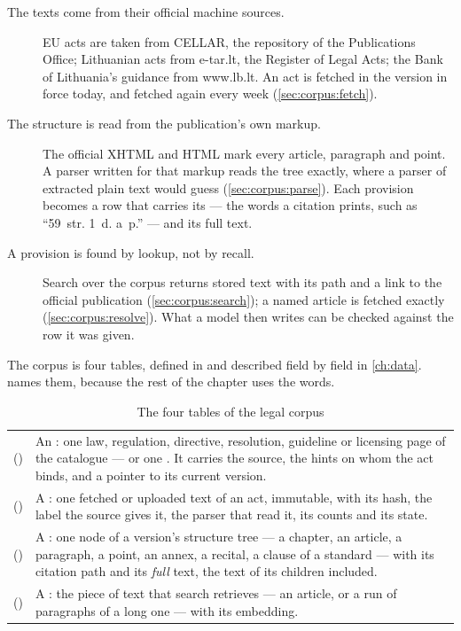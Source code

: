 \begin{description}
  \item[The texts come from their official machine sources.] EU acts are taken from CELLAR,
    the repository of the Publications Office; Lithuanian acts from e-tar.lt, the Register of
    Legal Acts; the Bank of Lithuania's guidance from www.lb.lt. An act is fetched in the
    version in force today, and fetched again every week (\cref{sec:corpus:fetch}).
  \item[The structure is read from the publication's own markup.] The official XHTML and HTML
    mark every article, paragraph and point. A parser written for that markup reads the tree
    exactly, where a parser of extracted plain text would guess
    (\cref{sec:corpus:parse}). Each provision becomes a row that carries its
     --- the words a citation prints, such as \enquote{59~str. 1~d. a~p.}
    --- and its full text.
  \item[A provision is found by lookup, not by recall.] Search over the corpus returns stored
    text with its path and a link to the official publication
    (\cref{sec:corpus:search}); a named article is fetched exactly
    (\cref{sec:corpus:resolve}). What a model then writes can be checked against the row it
    was given.
\end{description}

The corpus is four tables, defined in  and described field by field in
\cref{ch:data}.  names them, because the rest of the chapter uses the
words.

\begin{table}[H]
\caption{The four tables of the legal corpus}\label{tab:corpus:tables}
\begin{tabularx}{\textwidth}{@{}L{44mm}Y@{}}
\toprule
{} &  \\
\midrule
{} () & An : one law, regulation, directive, resolution, guideline or licensing page of the catalogue --- or one . It carries the source, the hints on whom the act binds, and a pointer to its current version. \\
 () & A : one fetched or uploaded text of an act, immutable, with its hash, the label the source gives it, the parser that read it, its counts and its state. \\
 () & A : one node of a version's structure tree --- a chapter, an article, a paragraph, a point, an annex, a recital, a clause of a standard --- with its citation path and its \emph{full} text, the text of its children included. \\
 () & A : the piece of text that search retrieves --- an article, or a run of paragraphs of a long one --- with its embedding. \\
\bottomrule
\end{tabularx}
\end{table}

